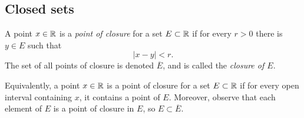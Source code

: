 \subsection{Closed sets}

\begin{definition}
	A point $x \in \mathbb{R}$ is a \emph{point of closure} 
	for a set $E \subset \mathbb{R}$ if
	for every $r > 0$
	there is $y \in E$
	such that
	\[
		\left\lvert x - y \right\rvert < r.
	\]
	The set of all points of closure is denoted $\overline E$,
	and is called the \emph{closure of $E$}. 
\end{definition}

Equivalently, a point $x \in \mathbb{R}$ is a point of closure
for a set $E \subset \mathbb{R}$ if
for every open interval containing $x$,
it contains a point of $E$.
Moreover, observe that each element of $E$ is a point of closure in $E$,
so $E \subset \overline E$.
